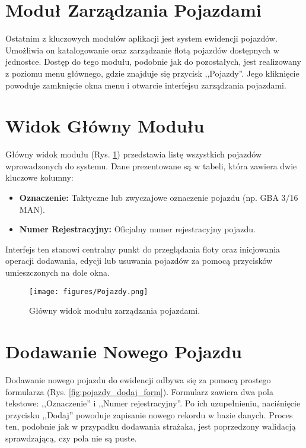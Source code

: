 \section{Moduł Zarządzania Pojazdami}
\label{chap:pojazdy}

Ostatnim z kluczowych modułów aplikacji jest system ewidencji pojazdów. Umożliwia on katalogowanie oraz zarządzanie flotą pojazdów dostępnych w jednostce. Dostęp do tego modułu, podobnie jak do pozostałych, jest realizowany z poziomu menu głównego, gdzie znajduje się przycisk ,,Pojazdy''. Jego kliknięcie powoduje zamknięcie okna menu i otwarcie interfejsu zarządzania pojazdami.

\section*{Widok Główny Modułu}
\label{sec:pojazdy_widok}

Główny widok modułu (Rys. \ref{fig:pojazdy_lista}) przedstawia listę wszystkich pojazdów wprowadzonych do systemu. Dane prezentowane są w tabeli, która zawiera dwie kluczowe kolumny:
\begin{itemize}
    \item \textbf{Oznaczenie:} Taktyczne lub zwyczajowe oznaczenie pojazdu (np. GBA 3/16 MAN).
    \item \textbf{Numer Rejestracyjny:} Oficjalny numer rejestracyjny pojazdu.
\end{itemize}
Interfejs ten stanowi centralny punkt do przeglądania floty oraz inicjowania operacji dodawania, edycji lub usuwania pojazdów za pomocą przycisków umieszczonych na dole okna.

\begin{figure}[H]
	\centering
	\texttt{[image: figures/Pojazdy.png]}
	\caption{Główny widok modułu zarządzania pojazdami.}
	\label{fig:pojazdy_lista}
\end{figure}

\section*{Dodawanie Nowego Pojazdu}
\label{sec:pojazdy_dodaj}

Dodawanie nowego pojazdu do ewidencji odbywa się za pomocą prostego formularza (Rys. \ref{fig:pojazdy_dodaj_form}). Formularz zawiera dwa pola tekstowe: ,,Oznaczenie'' i ,,Numer rejestracyjny''. Po ich uzupełnieniu, naciśnięcie przycisku ,,Dodaj'' powoduje zapisanie nowego rekordu w bazie danych. Proces ten, podobnie jak w przypadku dodawania strażaka, jest poprzedzony walidacją sprawdzającą, czy pola nie są puste.

